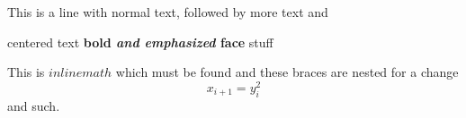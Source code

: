 This is a line with normal text, followed by
more text and
\begin{center}
centered text \textbf{bold \emph{and emphasized} face} stuff
\end{center}
This is $inline math$ which must be found %
and {these {braces are} nested} for a change
$$
x_{i+1} = y_i^2
$$
and such.